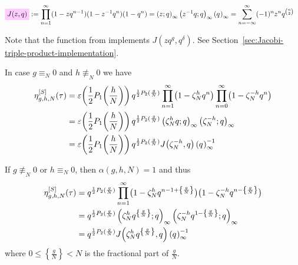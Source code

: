 \documentclass{article}
\begin{document}
\begin{Definition}
  \label{def:Jacobi-triple-product}
\begin{align}
  \defineNotation[J-z-q]{\jacobiFunction{z}{q}}
  &:=
    \prod_{n=1}^\infty (1-z q^{n-1}) (1-z^{-1}q^n) (1-q^n)
  = \qPochhammer{z}{q} \qPochhammer{z^{-1}q}{q} \eulerFunction{}
  = \sum_{n=-\infty}^\infty (-1)^n z^n q^{\binom{n}{2}}
  \label{eq:Jacobi-triple-product}
\end{align}
\end{Definition}


Note that the function  from
 implements
$J(zq^g,q^\delta)$. See Section~\ref{sec:Jacobi-triple-product-implementation}.





In case $g\equiv_N 0$ and $h\not\equiv_N 0$ we have
\begin{align*}
  \eta_{g,h,N}^{[S]}(\tau)
  &=
  \varepsilon\!\left(\frac{1}{2}
    P_1\!\left(\frac{h}{N}\right)\right)
    q^{\frac{1}{2} P_2(\frac{g}{N})}
  \prod_{n=1}^\infty
    \bigl(1-\zeta_N^h q^n\bigr)
  \prod_{n=0}^\infty
    \bigl(1-\zeta_N^{-h} q^n\bigr)
  \notag\\
  &=
  \varepsilon\!\left(\frac{1}{2}
    P_1\!\left(\frac{h}{N}\right)\right)
    q^{\frac{1}{2} P_2(\frac{g}{N})}
  \left( \zeta_N^h q;q \right)_{\infty}
  \left( \zeta_N^{-h};q \right)_{\infty}
  \notag\\
  &=
  \varepsilon\!\left(\frac{1}{2}
    P_1\!\left(\frac{h}{N}\right)\right)
    q^{\frac{1}{2} P_2(\frac{g}{N})}
    J\!\left(\zeta_N^{-h},q\right) \left({q}^{}\right)_{\infty}^{-1}
\end{align*}




If $g\not\equiv_N 0$ or $h\equiv_N 0$, then $\alpha(g,h,N)=1$ and thus
\begin{align*}
  \eta_{g,h,N}^{[S]}(\tau)
  &=
  q^{\frac{1}{2} P_2(\frac{g}{N})}
  \prod_{n=1}^\infty
    \bigl(1-\zeta_N^h q^{n-1 + \left\{\frac{g}{N}\right\}}\bigr)
    \bigl(1-\zeta_N^{-h} q^{n - \left\{\frac{g}{N}\right\}}\bigr)
  \notag\\
  &=
  q^{\frac{1}{2} P_2(\frac{g}{N})}
  \left( \zeta_N^h q^{\left\{\frac{g}{N}\right\}};q \right)_{\infty}
  \left( \zeta_N^{-h} q^{1-\left\{\frac{g}{N}\right\}};q \right)_{\infty}
  \notag\\
  &=
  q^{\frac{1}{2} P_2(\frac{g}{N})}
    J\!\left(\zeta_N^h q^{\left\{\frac{g}{N}\right\}},q\right)
    \left({q}^{}\right)_{\infty}^{-1}
\end{align*}
where $0\le\left\{\frac{g}{N}\right\}<N$ is the fractional part of
$\frac{g}{N}$.
\end{document}
